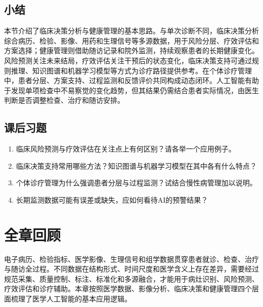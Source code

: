 \subsection*{小结}

本节介绍了临床决策分析与健康管理的基本思路。与单次诊断不同，临床决策分析综合病历、检验、影像、用药和生理信号等多源数据，用于风险分层、疗效评估和方案选择；健康管理则借助随访记录和院外监测，持续观察患者的长期健康变化。风险预测关注未来结局，疗效评估关注干预后的状态变化，临床决策支持可通过规则推理、知识图谱和机器学习模型等方式为诊疗路径提供参考。在个体诊疗管理中，患者分层、方案支持、过程监测和反馈评价共同构成动态闭环。人工智能有助于发现单项检查中不易察觉的变化趋势，但其结果仍需结合患者实际情况，由医生判断是否调整检查、治疗和随访安排。

\bigskip
\subsection*{课后习题}
\begin{enumerate}
\setlength{\itemsep}{3pt}

\item 临床风险预测与疗效评估在关注点上有何区别？请各举一个应用例子。
\item 临床决策支持常用哪些方法？知识图谱与机器学习模型在其中各有什么特点？
\item 个体诊疗管理为什么强调患者分层与过程监测？试结合慢性病管理加以说明。
\item 长期监测数据可能有误差或缺失，应如何看待AI的预警结果？
\end{enumerate}

\clearpage
\section*{全章回顾}

电子病历、检验指标、医学影像、生理信号和组学数据贯穿患者就诊、检查、治疗与随访全过程。不同数据在结构形式、时间尺度和医学含义上存在差异，需要经过规范采集、质量控制、标注、标准化和多源融合，才能用于病灶识别、风险预测、疗效评估和诊疗辅助。本章按照医学数据、影像分析、临床决策和健康管理四个层面梳理了医学人工智能的基本应用逻辑。


